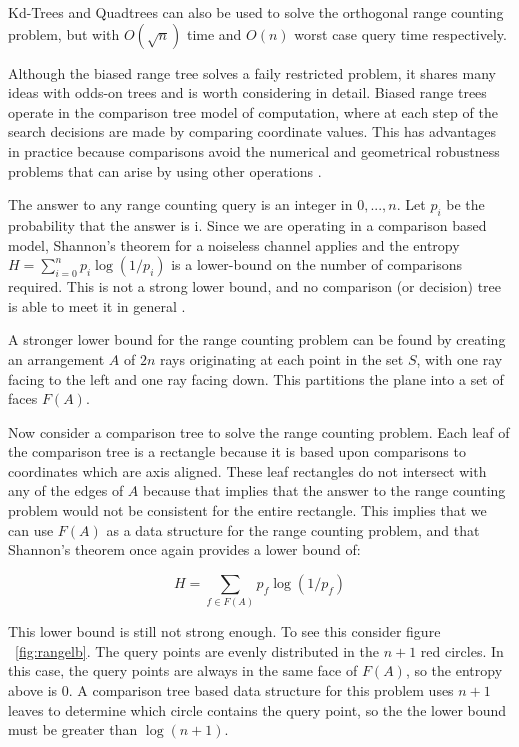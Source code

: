 \documentclass[mcs]{scsthesis}
\begin{document}
Kd-Trees and Quadtrees can also be used to solve the orthogonal range counting
problem, but with \(O(\sqrt n)\) time and \(O(n)\) worst case query time
respectively.

Although the biased range tree solves a faily restricted problem, it shares
many ideas with odds-on trees and is worth considering in detail. Biased range
trees operate in the comparison tree model of computation, where at each step
of the search decisions are made by comparing coordinate values. This has
advantages in practice because comparisons avoid the numerical and geometrical
robustness problems that can arise by using other operations \cite{biasedrange}. 

The answer to any range counting query is an integer in \({0, ..., n}\). Let
\(p_i\) be the probability that the answer is i. Since we are operating in a
comparison based model, Shannon's theorem for a noiseless channel applies and
the entropy \(H=\sum_{i=0}^n{p_i\log(1/p_i)}\) is a lower-bound on the number of
comparisons required. This is not a strong lower bound, and no comparison (or
decision) tree is able to meet it in general \cite{biasedrange}.

A stronger lower bound for the range counting problem can be found by creating
an arrangement \(A\) of \(2n\) rays originating at each point in the set \(S\),
with one ray facing to the left and one ray facing down. This partitions the
plane into a set of faces \(F(A)\).

Now consider a comparison tree to solve the range counting problem. Each leaf of
the comparison tree is a rectangle because it is based upon comparisons to
coordinates which are axis aligned.  These leaf rectangles do not intersect with
any of the edges of \(A\) because that implies that the answer to the range
counting problem would not be consistent for the entire rectangle. This implies
that we can use \(F(A)\) as a data structure for the range counting problem,
and that Shannon's theorem once again provides a lower bound of:

$$
H=\sum_{f \in F(A)}{p_f\log(1/p_f)}
$$

This lower bound is still not strong enough. To see this consider figure
~\ref{fig:rangelb}. The query points are evenly distributed in the \(n + 1\)
red circles. In this case, the query points are always in the same face of
\(F(A)\), so the entropy above is 0. A comparison tree based data structure
for this problem uses \(n + 1\) leaves to determine which circle contains
the query point, so the the lower bound must be greater than \(\log(n + 1)\).
\end{document}
